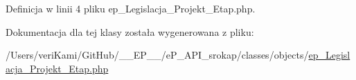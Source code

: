 Definicja w linii 4 pliku ep\-\_\-\-Legislacja\-\_\-\-Projekt\-\_\-\-Etap.\-php.



Dokumentacja dla tej klasy została wygenerowana z pliku\-:\begin{DoxyCompactItemize}
\item 
/\-Users/veri\-Kami/\-Git\-Hub/\-\_\-\-\_\-\-E\-P\-\_\-\-\_\-/e\-P\-\_\-\-A\-P\-I\-\_\-srokap/classes/objects/\hyperlink{ep___legislacja___projekt___etap_8php}{ep\-\_\-\-Legislacja\-\_\-\-Projekt\-\_\-\-Etap.\-php}\end{DoxyCompactItemize}
